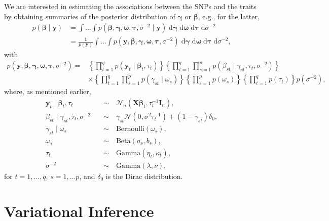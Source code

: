 \documentclass[a4paper, 11pt]{report}
\numberwithin{equation}{chapter}
\begin{document}
We are interested in estimating the associations between the SNPs and the traits by obtaining summaries of the posterior distribution of $\boldsymbol{\gamma}$ or $\boldsymbol{\beta}$, e.g., for the latter,
\begin{align*}
p(\boldsymbol{\beta}\mid\boldsymbol{y})&=\int\dots\int p(\boldsymbol{\beta},\boldsymbol{\gamma},\boldsymbol{\omega},\boldsymbol{\tau},\sigma^{-2}\mid\boldsymbol{y})\;\mathrm{d}\boldsymbol{\gamma}\;\mathrm{d}\boldsymbol{\omega}\;\mathrm{d}\boldsymbol{\tau}\;\mathrm{d}\sigma^{-2}\\
&=\frac{1}{p(\boldsymbol{y})}\int\dots\int p(\boldsymbol{y},\boldsymbol{\beta},\boldsymbol{\gamma},\boldsymbol{\omega},\boldsymbol{\tau},\sigma^{-2})\;\mathrm{d}\boldsymbol{\gamma}\;\mathrm{d}\boldsymbol{\omega}\;\mathrm{d}\boldsymbol{\tau}\;\mathrm{d}\sigma^{-2},
\end{align*}
with 
\begin{align*}
p(\boldsymbol{y},\boldsymbol{\beta},\boldsymbol{\gamma},\boldsymbol{\omega},\boldsymbol{\tau},\sigma^{-2}) = &\left\lbrace\prod_{t=1}^qp(\boldsymbol{y}_t \mid \boldsymbol{\beta}_t,\tau_t)\right\rbrace\left\lbrace\prod_{t=1}^q\prod_{s=1}^p p(\beta_{st} \mid \gamma_{st},\tau_t,\sigma^{-2})\right\rbrace\\
&\times \left\lbrace \prod_{t=1}^q\prod_{s=1}^p p(\gamma_{st} \mid \omega_s)\right\rbrace\left\lbrace \prod_{s=1}^p p(\omega_s)\right\rbrace\left\lbrace\prod_{t=1}^q p(\tau_t)\right\rbrace p(\sigma^{-2}),
\end{align*}
where, as mentioned earlier,
\begin{align*}
\boldsymbol{y}_t \mid \boldsymbol{\beta}_t,\tau_t \quad &\sim \quad \mathcal{N}_n\left(\boldsymbol{X}\boldsymbol{\beta}_t,\tau_t^{-1}\boldsymbol{I}_n\right),\\
\beta_{st} \mid \gamma_{st},\tau_t,\sigma^{-2} \quad &\sim \quad \gamma_{st}\mathcal{N}\left(0,\sigma^2\tau_t^{-1}\right)+(1-\gamma_{st})\delta_0,\\
\gamma_{st} \mid \omega_s \quad &\sim \quad \mathrm{Bernoulli}(\omega_s),\\
\omega_s \quad &\sim \quad \mathrm{Beta}(a_s,b_s),\\
\tau_t \quad &\sim \quad \mathrm{Gamma}(\eta_t,\kappa_t),\\
\sigma^{-2} \quad &\sim \quad \mathrm{Gamma}(\lambda, \nu),
\end{align*}
for $t=1,\dots,q$, $s=1,\dots p$, and $\delta_0$ is the Dirac distribution.
\newpage
\chapter{Variational Inference}
\end{document}
